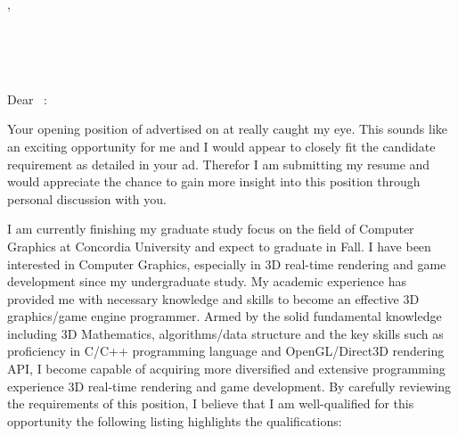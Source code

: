 \documentclass[11pt]{letter}
\begin{document}
\begin{letter}{
    \clcontacttile\ \clcontactname  \\
    \clcontactposition              \\
    \clcompanyname                  \\
    \clcompanyaddr                  \\
    \clcompanycity,\ \clcompanyprov \\
    \clcompanyzip} 

\begin{center}
\large\bf 
\clmyname                           \\ 

\clmyaddr                           \\
\clmyemail                          \\
\clmyphone
\end{center} 

\vfill %
 
\opening{Dear \clcontacttitle\ \clcontactname:} 

Your opening position of \cljobpostedtitle advertised on \cljobposteddate at \cljobpostedplace really caught my eye. This sounds like an exciting opportunity for me and I would appear to closely fit the candidate requirement as detailed in your ad. Therefor I am submitting my resume and would appreciate the chance to gain more insight into this position through personal discussion with you.      

I am currently finishing my graduate study focus on the field of Computer Graphics at Concordia University and expect to graduate in Fall. I have been interested in Computer Graphics, especially in 3D real-time rendering and game development since my undergraduate study. My academic experience has provided me with necessary knowledge and skills to become an effective 3D graphics/game engine programmer. Armed by the solid fundamental knowledge including 3D Mathematics, algorithms/data structure and the key skills such as proficiency in C/C++ programming language and OpenGL/Direct3D rendering API, I become capable of acquiring more diversified and extensive programming experience 3D real-time rendering and game development. By carefully reviewing the requirements of this position, I believe that I am well-qualified for this opportunity the following listing highlights the qualifications:

\begin{myitemize}
    

\end{myitemize}
\end{letter}
\end{document}
